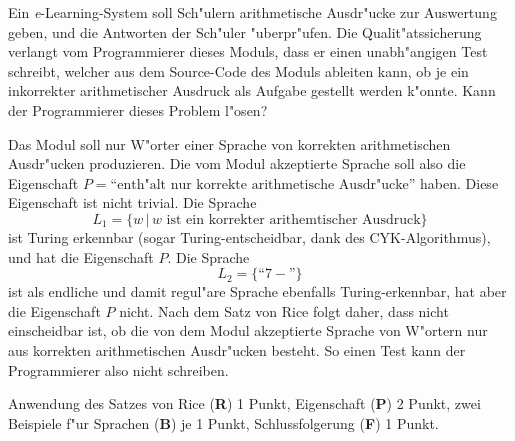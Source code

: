Ein {\it e}-Learning-System soll Sch"ulern arithmetische Ausdr"ucke
zur Auswertung geben, und die Antworten der Sch"uler "uberpr"ufen.
Die Qualit"atssicherung verlangt vom Programmierer dieses Moduls, dass
er einen unabh"angigen Test schreibt, welcher aus dem Source-Code
des Moduls ableiten kann, ob je ein inkorrekter arithmetischer Ausdruck
als Aufgabe gestellt werden k"onnte. Kann der Programmierer dieses
Problem l"osen?

\begin{loesung}
Das Modul soll nur W"orter einer Sprache von korrekten arithmetischen
Ausdr"ucken produzieren.
Die vom Modul akzeptierte Sprache soll also die Eigenschaft
$P=\text{``enth"alt nur korrekte arithmetische Ausdr"ucke''}$
haben. 
Diese Eigenschaft ist nicht trivial. Die Sprache
\[
L_1=\{w\,|\,\text{$w$ ist ein korrekter arithemtischer Ausdruck}\}
\]
ist Turing erkennbar (sogar Turing-entscheidbar, dank des CYK-Algorithmus),
und hat die Eigenschaft $P$.
Die Sprache
\[
L_2=\{ \text{``$7-$''}\}
\]
ist als endliche und damit regul"are Sprache ebenfalls Turing-erkennbar,
hat aber die Eigenschaft $P$ nicht. Nach dem Satz von Rice folgt daher,
dass nicht einscheidbar ist, ob die von dem Modul akzeptierte Sprache
von W"ortern nur aus korrekten arithmetischen Ausdr"ucken besteht.
So einen Test kann der Programmierer also nicht schreiben.
\end{loesung}

\begin{bewertung}
Anwendung des Satzes von Rice ({\bf R}) 1 Punkt,
Eigenschaft ({\bf P}) 2 Punkt,
zwei Beispiele f"ur Sprachen ({\bf B}) je 1 Punkt,
Schlussfolgerung ({\bf F}) 1 Punkt.
\end{bewertung}
